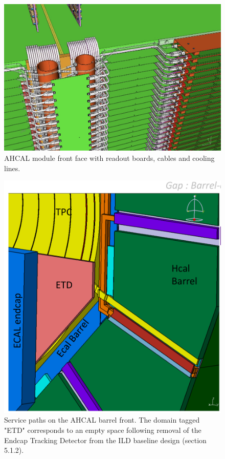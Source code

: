 \begin{figure}[h!]
    \centering
        \includegraphics[width=0.9\hsize]{Integration/fig/AHCAL_Services_Closeup.png}
    \caption{AHCAL module front face with readout boards, cables and cooling lines.}
    \label{ILD:fig:ahcal_services_closeup}
\end{figure}
\begin{figure}[h!]
    \centering
        \includegraphics[width=0.7\hsize]{Integration/fig/Barrel_Services.pdf}
    \caption{Service paths on the AHCAL barrel front. The domain tagged "ETD" corresponds to an empty space following removal of the Endcap Tracking Detector from the ILD baseline design (section 5.1.2).}
    \label{ILD:fig:barrel_services}
\end{figure}
